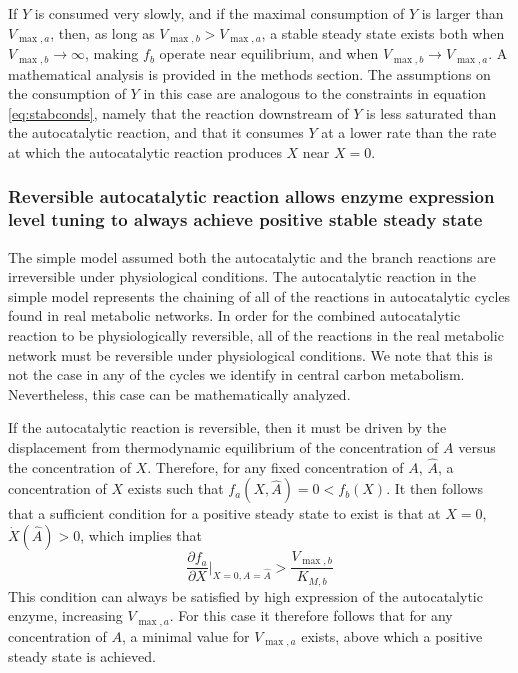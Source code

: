     If $Y$ is consumed very slowly, and if the maximal consumption of $Y$ is larger than $V_{\max,a}$, then, as long as $V_{\max,b}>V_{\max,a}$, a stable steady state exists both when  $V_{\max,b}\rightarrow\infty$, making $f_b$ operate near equilibrium, and when $V_{\max,b}\rightarrow V_{\max,a}$.
    A mathematical analysis is provided in the methods section.
    The assumptions on the consumption of $Y$ in this case are analogous to the constraints in equation \ref{eq:stabconds}, namely that the reaction downstream of $Y$ is less saturated than the autocatalytic reaction, and that it consumes $Y$ at a lower rate than the rate at which the autocatalytic reaction produces $X$ near $X=0$.


    \subsubsection{Reversible autocatalytic reaction allows enzyme expression level tuning to always achieve positive stable steady state}
    The simple model assumed both the autocatalytic and the branch reactions are irreversible under physiological conditions.
    The autocatalytic reaction in the simple model represents the chaining of all of the reactions in autocatalytic cycles found in real metabolic networks.
    In order for the combined autocatalytic reaction to be physiologically reversible, all of the reactions in the real metabolic network must be reversible under physiological conditions.
    We note that this is not the case in any of the cycles we identify in central carbon metabolism.
    Nevertheless, this case can be mathematically analyzed.

    If the autocatalytic reaction is reversible, then it must be driven by the displacement from thermodynamic equilibrium of the concentration of $A$ versus the concentration of $X$.
    Therefore, for any fixed concentration of $A$, $\hat{A}$, a concentration of $X$ exists such that $f_a(X,\hat{A})=0<f_b(X)$.
    It then follows that a sufficient condition for a positive steady state to exist is that at $X=0$, $\dot{X}(\hat{A})>0$, which implies that
    \begin{equation*}
        \frac{\partial f_a}{\partial X}\Big\vert_{X=0,A=\hat{A}}>\frac{V_{\max,b}}{K_{M,b}}
    \end{equation*}
    This condition can always be satisfied by high expression of the autocatalytic enzyme, increasing $V_{\max,a}$.
    For this case it therefore follows that for any concentration of $A$, a minimal value for $V_{\max,a}$ exists, above which a positive steady state is achieved.

